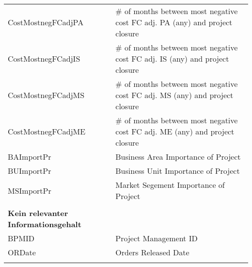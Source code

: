 \begin{longtable}[ht]{p{} p{}}
		CostMostnegFCadjPA & \# of months between most negative cost FC adj. PA (any) and project closure \\
		CostMostnegFCadjIS & \# of months between most negative cost FC adj. IS (any) and project closure \\
		CostMostnegFCadjMS & \# of months between most negative cost FC adj. MS (any) and project closure \\
		CostMostnegFCadjME & \# of months between most negative cost FC adj. ME (any) and project closure \\
		BAImportPr & Business Area Importance of Project \\
		BUImportPr & Business Unit Importance of Project \\
		MSImportPr & Market Segement Importance  of Project \\
		&\\
		\textbf{Kein relevanter Informationsgehalt} & \\\hline
		BPMID & Project Management ID \\
		ORDate & Orders Released Date \\
	\label{tab:addlabel}%
\end{longtable}%
\newpage
